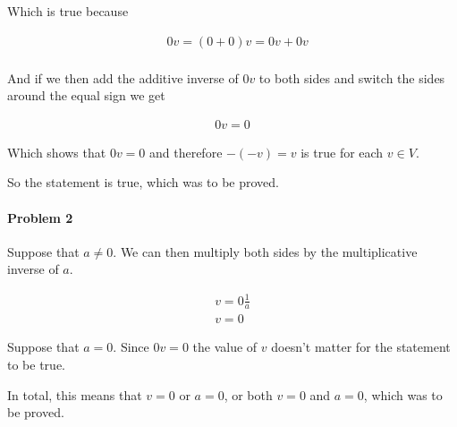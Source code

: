 Which is true because

\begin{align*}
	&0v = (0 + 0)v = 0v + 0v \\
\end{align*}

And if we then add the additive inverse of $0v$ to both sides and switch the sides around the equal sign we get

\begin{align*}
	0v = 0
\end{align*}

Which shows that $0v = 0$ and therefore $-(-v) = v$ is true for each $v \in V$.

So the statement is true, which was to be proved.

\paragraph{Problem 2}
Suppose that $a \neq 0$. We can then multiply both sides by the multiplicative inverse of $a$.

\begin{align*}
	v = 0\frac{1}{a} \\
	v = 0
\end{align*}

Suppose that $a = 0$. Since $0v = 0$ the value of $v$ doesn't matter for the statement to be true. 

In total, this means that $v = 0$ or $a = 0$, or both $v = 0$ and $a = 0$, which was to be proved.






































































